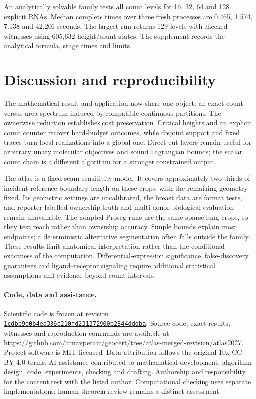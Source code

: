 \documentclass[10pt,letterpaper]{article}
\begin{document}
An analytically solvable family tests all count levels for 16, 32, 64 and 128 explicit RNAs. Median complete times over three fresh processes are 0.465, 1.574, 7.138 and 42.206 seconds. The largest run returns 129 levels with checked witnesses using 605,632 height/count states. The supplement records the analytical formula, stage times and limits.

\section{Discussion and reproducibility}
The mathematical result and application now share one object: an exact count-versus-area spectrum induced by compatible continuous partitions. The ownerwise reduction establishes cost preservation. Critical heights and an explicit count counter recover hard-budget outcomes, while disjoint support and fixed traces turn local realizations into a global one. Direct cut layers remain useful for arbitrary unary molecular objectives and sound Lagrangian bounds; the scalar count chain is a different algorithm for a stronger constrained output.

The atlas is a fixed-seam sensitivity model. It covers approximately two-thirds of incident reference boundary length on these crops, with the remaining geometry fixed. Its geometric settings are uncalibrated, the breast data are format tests, and reporter-labelled ownership truth and multi-donor biological evaluation remain unavailable. The adapted Proseg runs use the same sparse lung crops, so they test reach rather than ownership accuracy. Simple bounds explain most endpoints; a deterministic alternative segmentation often falls outside the family. These results limit anatomical interpretation rather than the conditional exactness of the computation. Differential-expression significance, false-discovery guarantees and ligand--receptor signaling require additional statistical assumptions and evidence beyond count intervals.

\paragraph{Code, data and assistance.}
Scientific code is frozen at revision \href{https://github.com/arnavperam/geocert/tree/1cdbb9e0b4ea386c210fd231372900b2844dddba/atlas2027}{\nolinkurl{1cdbb9e0b4ea386c210fd231372900b2844dddba}}. Source code, exact results, witnesses and reproduction commands are available at \url{https://github.com/arnavperam/geocert/tree/atlas-merged-revision/atlas2027}. Project software is MIT licensed. Data attribution follows the original 10x CC BY 4.0 terms. AI assistance contributed to mathematical development, algorithm design, code, experiments, checking and drafting. Authorship and responsibility for the content rest with the listed author. Computational checking uses separate implementations; human theorem review remains a distinct assessment.

\clearpage

\end{document}
